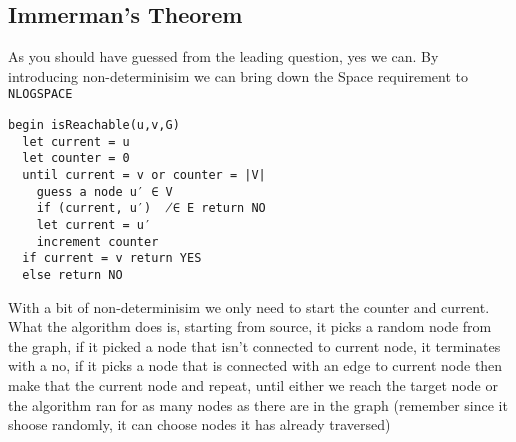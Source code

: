 \subsection{Immerman’s Theorem}
As you should have guessed from the leading question, yes we can. 
By introducing non-determinisim we can bring down the Space requirement to \texttt{NLOGSPACE}
\begin{verbatim}
begin isReachable(u,v,G)
  let current = u
  let counter = 0
  until current = v or counter = |V|
    guess a node u′ ∈ V
    if (current, u′)  ̸∈ E return NO 
    let current = u′
    increment counter
  if current = v return YES 
  else return NO
\end{verbatim}
With a bit of non-determinisim we only need to start the counter and current.
What the algorithm does is, starting from source, it picks a random node from the graph, 
if it picked a node that isn't connected to current node,
it terminates with a no, if it picks a node that is connected with an edge to current node then make that the current node and repeat, 
until either we reach the target node or the algorithm ran for as many nodes as there are in the graph (remember since it shoose randomly, it can choose nodes it has already traversed)
